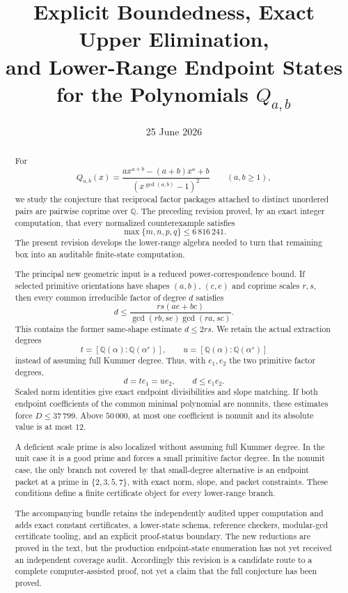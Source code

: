 \documentclass[11pt]{article}
\title{Explicit Boundedness, Exact Upper Elimination,\\
and Lower-Range Endpoint States for the Polynomials \(Q_{a,b}\)}
\author{}
\date{25 June 2026}
\theoremstyle{definition}
\newcommand{\Q}{\mathbb Q}
\begin{document}
\maketitle

\begin{abstract}
For
\[
 Q_{a,b}(x)=
 \frac{a x^{a+b}-(a+b)x^a+b}
 {(x^{\gcd(a,b)}-1)^2}
 \qquad(a,b\geq1),
\]
we study the conjecture that reciprocal factor packages attached to distinct
unordered pairs are pairwise coprime over \(\Q\).  The preceding revision
proved, by an exact integer computation, that every normalized counterexample
satisfies
\[
 \max\{m,n,p,q\}\leq6\,816\,241.
\]
The present revision develops the lower-range algebra needed to turn that
remaining box into an auditable finite-state computation.

The principal new geometric input is a reduced power-correspondence bound.
If selected primitive orientations have shapes \((a,b)\), \((c,e)\) and
coprime scales \(r,s\), then every common irreducible factor of degree \(d\)
satisfies
\[
 d\leq
 \frac{rs(ae+bc)}
 {\gcd(rb,se)\gcd(ra,sc)}.
\]
This contains the former same-shape estimate \(d\leq2rs\).  We retain the
actual extraction degrees
\[
 t=[\Q(\alpha):\Q(\alpha^r)],\qquad
 u=[\Q(\alpha):\Q(\alpha^s)]
\]
instead of assuming full Kummer degree.  Thus, with \(e_1,e_2\) the two
primitive factor degrees,
\[
 d=te_1=ue_2,\qquad d\leq e_1e_2.
\]
Scaled norm identities give exact endpoint divisibilities and slope matching.
If both endpoint coefficients of the common minimal polynomial are nonunits,
these estimates force \(D\leq37\,799\).  Above \(50\,000\), at most one
coefficient is nonunit and its absolute value is at most \(12\).

A deficient scale prime is also localized without assuming full Kummer
degree.  In the unit case it is a good prime and forces a small primitive
factor degree.  In the nonunit case, the only branch not covered by that
small-degree alternative is an endpoint packet at a prime in
\(\{2,3,5,7\}\), with exact norm, slope, and packet constraints.  These
conditions define a finite certificate object for every lower-range branch.

The accompanying bundle retains the independently audited upper computation
and adds exact constant certificates, a lower-state schema, reference
checkers, modular-gcd certificate tooling, and an explicit proof-status
boundary.  The new reductions are proved in the text, but the production
endpoint-state enumeration has not yet received an independent coverage
audit.  Accordingly this revision is a candidate route to a complete
computer-assisted proof, not yet a claim that the full conjecture has been
proved.
\end{abstract}
\end{document}
